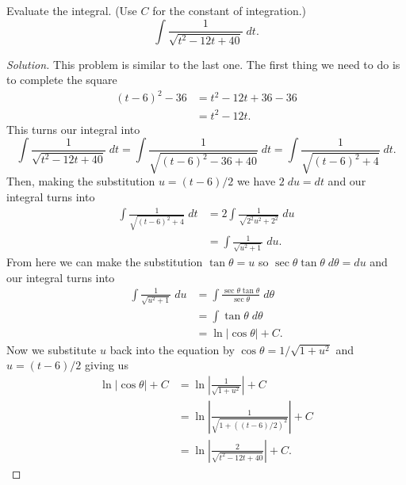 \begin{problem}[WebAssign, HW 12, \# 4]
Evaluate the integral. (Use $C$ for the constant of integration.)
\[
\int\frac{1}{\sqrt{t^2-12t+40}}\;dt.
\]
\end{problem}
\begin{proof}[Solution]
This problem is similar to the last one. The first thing we need to do is
to complete the square
\begin{align*}
(t-6)^2-36&=t^2-12t+36-36\\
          &=t^2-12t.
\end{align*}
This turns our integral into
$$
\int\frac{1}{\sqrt{t^2-12t+40}}\;dt=
\int\frac{1}{\sqrt{(t-6)^2-36+40}}\;dt=
\int\frac{1}{\sqrt{(t-6)^2+4}}\;dt.
$$
Then, making the substitution $u=(t-6)/2$ we have $2\;du=dt$ and our
integral turns into
\begin{align*}
\int\frac{1}{\sqrt{(t-6)^2+4}}\;dt
&=2\int\frac{1}{\sqrt{2^2u^2+2^2}}\;du\\
&=\int\frac{1}{\sqrt{u^2+1}}\;du.
\end{align*}
From here we can make the substitution $\tan\theta=u$ so
$\sec\theta\tan\theta\;d\theta=du$ and our integral turns into
\begin{align*}
\int\frac{1}{\sqrt{u^2+1}}\;du
&=\int\frac{\sec\theta\tan\theta}{\sec\theta}\;d\theta\\
&=\int\tan\theta\;d\theta\\
&=\ln\left|\cos\theta\right|+C.
\end{align*}
Now we substitute $u$ back into the equation by $\cos\theta=1/\sqrt{1+u^2}$
and $u=(t-6)/2$ giving us
\begin{align*}
\ln\left|\cos\theta\right|+C
&=\ln\left|\frac{1}{\sqrt{1+u^2}}\right|+C\\
&=\ln\left|\frac{1}{\sqrt{1+((t-6)/2)^2}}\right|+C\\
&=\boxed{\ln\left|\frac{2}{\sqrt{t^2-12t+40}}\right|+C.}
\end{align*}
\end{proof}


